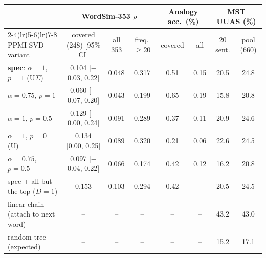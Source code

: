 \begin{tabular}{lccccccc}
\toprule
 & \multicolumn{3}{c}{WordSim-353 $\rho$} & \multicolumn{2}{c}{Analogy acc.\ (\%)} & \multicolumn{2}{c}{MST UUAS (\%)} \\
\cmidrule(lr){2-4}\cmidrule(lr){5-6}\cmidrule(lr){7-8}
PPMI-SVD variant & covered (248) [95\% CI] & all 353 & freq.\,$\ge$20 & covered & all & 20 sent. & pool (660) \\
\midrule
\textbf{spec}: $\alpha{=}1$, $p{=}1$ (U$\Sigma$) & 0.104 [$-$0.03, 0.22] & 0.048 & 0.317 & 0.51 & 0.15 & 20.5 & 24.8 \\
$\alpha{=}0.75$, $p{=}1$ & 0.060 [$-$0.07, 0.20] & 0.043 & 0.199 & 0.65 & 0.19 & 15.8 & 20.8 \\
$\alpha{=}1$, $p{=}0.5$ & 0.129 [$-$0.00, 0.24] & 0.091 & 0.289 & 0.37 & 0.11 & 20.9 & 24.6 \\
$\alpha{=}1$, $p{=}0$ (U) & 0.134 [0.00, 0.25] & 0.089 & 0.320 & 0.21 & 0.06 & 22.6 & 24.5 \\
$\alpha{=}0.75$, $p{=}0.5$ & 0.097 [$-$0.04, 0.22] & 0.066 & 0.174 & 0.42 & 0.12 & 16.2 & 20.8 \\
spec + all-but-the-top ($D{=}1$) & 0.153 & 0.103 & 0.294 & 0.42 & -- & 20.5 & 24.5 \\
\midrule
linear chain (attach to next word) & -- & -- & -- & -- & -- & 43.2 & 43.0 \\
random tree (expected) & -- & -- & -- & -- & -- & 15.2 & 17.1 \\
\bottomrule
\end{tabular}
